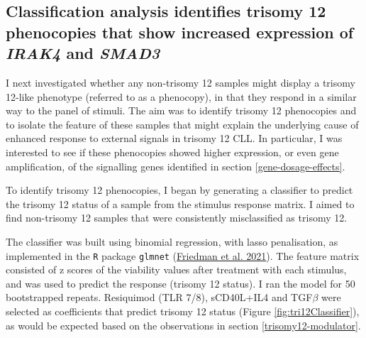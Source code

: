 \documentclass[11pt, a4paper, twosided]{book}
\begin{document}
\hypertarget{trisomy12-classifier}{%
\subsection{\texorpdfstring{Classification analysis identifies trisomy 12 phenocopies that show increased expression of \emph{IRAK4} and \emph{SMAD3}}{Classification analysis identifies trisomy 12 phenocopies that show increased expression of IRAK4 and SMAD3}}\label{trisomy12-classifier}}

I next investigated whether any non-trisomy 12 samples might display a trisomy 12-like phenotype (referred to as a phenocopy), in that they respond in a similar way to the panel of stimuli. The aim was to identify trisomy 12 phenocopies and to isolate the feature of these samples that might explain the underlying cause of enhanced response to external signals in trisomy 12 CLL. In particular, I was interested to see if these phenocopies showed higher expression, or even gene amplification, of the signalling genes identified in section \ref{gene-dosage-effects}.

To identify trisomy 12 phenocopies, I began by generating a classifier to predict the trisomy 12 status of a sample from the stimulus response matrix. I aimed to find non-trisomy 12 samples that were consistently misclassified as trisomy 12.

The classifier was built using binomial regression, with lasso penalisation, as implemented in the \texttt{R} package \texttt{glmnet} (\protect\hyperlink{ref-R-glmnet}{Friedman et al. 2021}). The feature matrix consisted of z scores of the viability values after treatment with each stimulus, and was used to predict the response (trisomy 12 status). I ran the model for 50 bootstrapped repeats. Resiquimod (TLR 7/8), sCD40L+IL4 and TGF\(\beta\) were selected as coefficients that predict trisomy 12 status (Figure \ref{fig:tri12Classifier}), as would be expected based on the observations in section \ref{trisomy12-modulator}.
\end{document}
